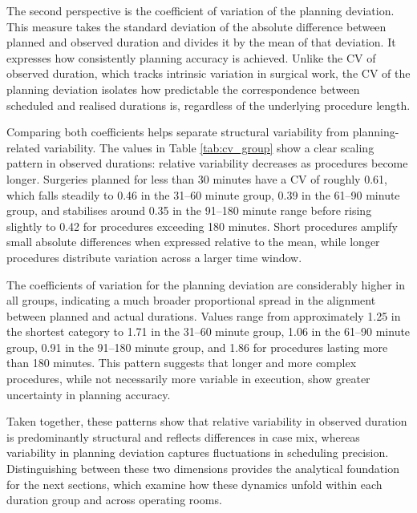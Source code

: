 \documentclass[
]{article}
\begin{document}
The second perspective is the coefficient of variation of the planning
deviation. This measure takes the standard deviation of the absolute
difference between planned and observed duration and divides it by the
mean of that deviation. It expresses how consistently planning accuracy
is achieved. Unlike the CV of observed duration, which tracks intrinsic
variation in surgical work, the CV of the planning deviation isolates
how predictable the correspondence between scheduled and realised
durations is, regardless of the underlying procedure length.

Comparing both coefficients helps separate structural variability from
planning-related variability. The values in Table \ref{tab:cv_group}
show a clear scaling pattern in observed durations: relative variability
decreases as procedures become longer. Surgeries planned for less than
30 minutes have a CV of roughly 0.61, which falls steadily to 0.46 in
the 31--60 minute group, 0.39 in the 61--90 minute group, and stabilises
around 0.35 in the 91--180 minute range before rising slightly to 0.42
for procedures exceeding 180 minutes. Short procedures amplify small
absolute differences when expressed relative to the mean, while longer
procedures distribute variation across a larger time window.

The coefficients of variation for the planning deviation are
considerably higher in all groups, indicating a much broader
proportional spread in the alignment between planned and actual
durations. Values range from approximately 1.25 in the shortest category
to 1.71 in the 31--60 minute group, 1.06 in the 61--90 minute group,
0.91 in the 91--180 minute group, and 1.86 for procedures lasting more
than 180 minutes. This pattern suggests that longer and more complex
procedures, while not necessarily more variable in execution, show
greater uncertainty in planning accuracy.

Taken together, these patterns show that relative variability in
observed duration is predominantly structural and reflects differences
in case mix, whereas variability in planning deviation captures
fluctuations in scheduling precision. Distinguishing between these two
dimensions provides the analytical foundation for the next sections,
which examine how these dynamics unfold within each duration group and
across operating rooms.
\end{document}
